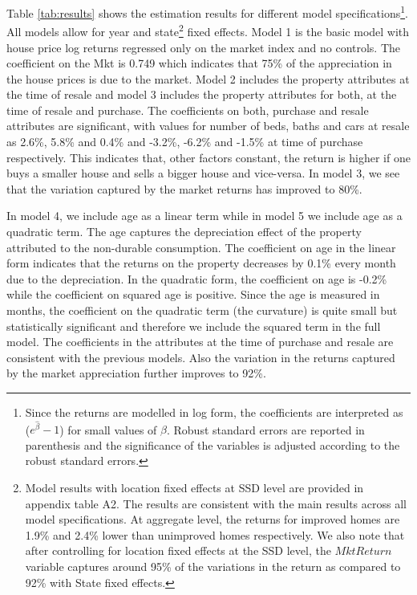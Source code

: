 \documentclass[AEJ,reqno, draftmode]{AEA} %
\begin{document}
Table \ref{tab:results} shows the estimation results for different model specifications\footnote{Since the returns are modelled in log form, the coefficients are interpreted as ($e^{\hat{\beta}}-1$) for small values of $\beta$. Robust standard errors are reported in parenthesis and the significance of the variables is adjusted according to the robust standard errors.}. All models allow for year and state\footnote{Model results with location fixed effects at SSD level are provided in appendix table A2. The results are consistent with the main results across all model specifications. At aggregate level, the returns for improved homes are 1.9\% and 2.4\% lower than unimproved homes respectively. We also note that after controlling for location fixed effects at the SSD level, the $MktReturn$ variable captures around 95\% of the variations in the return as compared to 92\% with State fixed effects.} fixed effects. Model 1 is the basic model with house price log returns regressed only on the market index and no controls. The coefficient on the Mkt is 0.749 which indicates that 75\% of the appreciation in the house prices is due to the market. Model 2 includes the property attributes at the time of resale and model 3 includes the property attributes for both, at the time of resale and purchase. The coefficients on both, purchase and resale attributes are significant, with values for number of beds, baths and cars at resale as 2.6\%, 5.8\% and 0.4\% and -3.2\%, -6.2\% and -1.5\% at time of purchase respectively. This indicates that, other factors constant, the return is higher if one buys a smaller house and sells a bigger house and vice-versa. In model 3, we see that the variation captured by the market returns has improved to 80\%. 

In model 4, we include age as a linear term while in model 5 we include age as a quadratic term. The age captures the depreciation effect of the property attributed to the non-durable consumption. The coefficient on age in the linear form indicates that the returns on the property decreases by 0.1\% every month due to the depreciation. In the quadratic form, the coefficient on age is -0.2\% while the coefficient on squared age is positive. Since the age is measured in months, the coefficient on the quadratic term (the curvature) is quite small but statistically significant and therefore we include the squared term in the full model. The coefficients in the attributes at the time of purchase and resale are consistent with the previous models. Also the variation in the returns captured by the market appreciation further improves to 92\%. 
\end{document}
